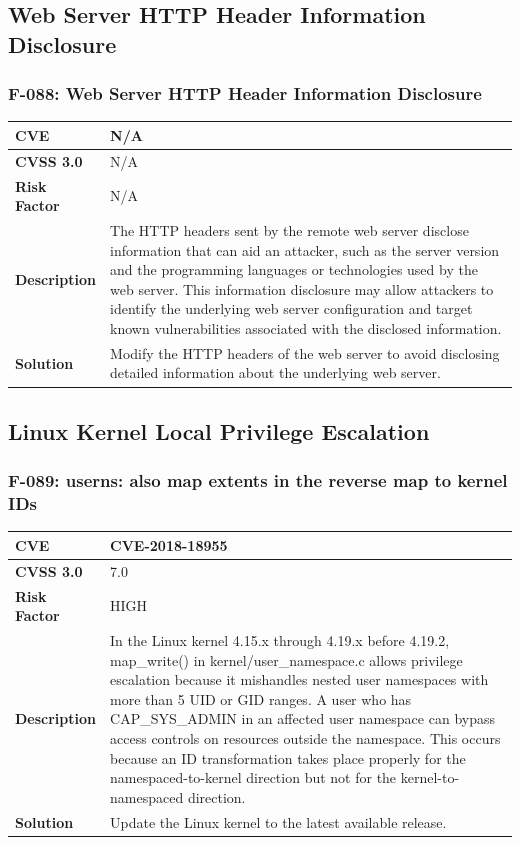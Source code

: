 %
%
\subsection{Web Server HTTP Header Information Disclosure}

\subsubsection{F-088: Web Server HTTP Header Information Disclosure}
\begin{tabular}{|p{2.8cm}|p{12.2cm}|}
\hline
\textbf{CVE} & N/A \\ \hline
\textbf{CVSS 3.0} & N/A \\ \hline
\textbf{Risk Factor} & N/A \\ \hline
\textbf{Description} & The HTTP headers sent by the remote web server disclose information that can aid an attacker, such as the server version and the programming languages or technologies used by the web server. This information disclosure may allow attackers to identify the underlying web server configuration and target known vulnerabilities associated with the disclosed information. \\ \hline
\textbf{Solution} & Modify the HTTP headers of the web server to avoid disclosing detailed information about the underlying web server. \\ \hline
\end{tabular}

%
%
\subsection{Linux Kernel Local Privilege Escalation}

\subsubsection{F-089: userns: also map extents in the reverse map to kernel IDs}
\begin{tabular}{|p{2.8cm}|p{12.2cm}|}
\hline
\textbf{CVE} & CVE-2018-18955 \\ \hline
\textbf{CVSS 3.0} & 7.0 \\ \hline
\textbf{Risk Factor} & HIGH \\ \hline
\textbf{Description} & In the Linux kernel 4.15.x through 4.19.x before 4.19.2, map\_write() in kernel/user\_namespace.c allows privilege escalation because it mishandles nested user namespaces with more than 5 UID or GID ranges. A user who has CAP\_SYS\_ADMIN in an affected user namespace can bypass access controls on resources outside the namespace. This occurs because an ID transformation takes place properly for the namespaced-to-kernel direction but not for the kernel-to-namespaced direction. \\ \hline
\textbf{Solution} & Update the Linux kernel to the latest available release. \\ \hline
\end{tabular}